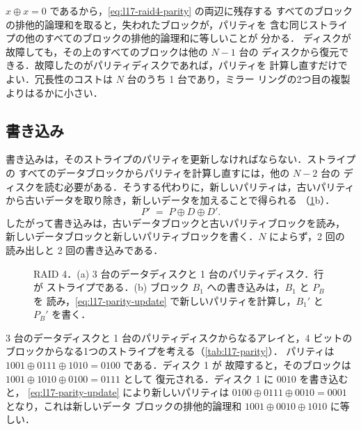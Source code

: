 \documentclass[../main.tex]{subfiles}
\begin{document}
$x \oplus x = 0$ であるから，\cref{eq:l17-raid4-parity} の両辺に残存する
すべてのブロックの排他的論理和を取ると，失われたブロックが，パリティを
含む同じストライプの他のすべてのブロックの排他的論理和に等しいことが
分かる．%
ディスクが故障しても，その上のすべてのブロックは他の $N-1$ 台の
ディスクから復元できる．故障したのがパリティディスクであれば，パリティを
計算し直すだけでよい．冗長性のコストは $N$ 台のうち 1 台であり，ミラー
リングの2つ目の複製よりはるかに小さい．

\subsection{書き込み}

書き込みは，そのストライプのパリティを更新しなければならない．ストライプの
すべてのデータブロックからパリティを計算し直すには，他の $N-2$ 台の
ディスクを読む必要がある．そうする代わりに，新しいパリティは，古いパリティ
から古いデータを取り除き，新しいデータを加えることで得られる
（\cref{fig:l17-raid4-write}b）．
\begin{equation}
  P' \;=\; P \oplus D \oplus D' .
  \label{eq:l17-parity-update}
\end{equation}
したがって書き込みは，古いデータブロックと古いパリティブロックを読み，
新しいデータブロックと新しいパリティブロックを書く．$N$ によらず，2 回の
読み出しと 2 回の書き込みである．

\begin{figure}[htbp]
  \centering
  
  \caption{RAID 4．(a) 3 台のデータディスクと 1 台のパリティディスク．行が
    ストライプである．(b) ブロック $B_1$ への書き込みは，$B_1$ と $P_B$ を
    読み，\cref{eq:l17-parity-update} で新しいパリティを計算し，$B_1'$ と
    $P_B'$ を書く．}
  \label{fig:l17-raid4-write}
\end{figure}

\begin{example}
  \label{ex:l17-parity}
  3 台のデータディスクと 1 台のパリティディスクからなるアレイと，4 ビットの
  ブロックからなる1つのストライプを考える（\cref{tab:l17-parity}）．
  パリティは $1001 \oplus 0111 \oplus 1010 = 0100$ である．ディスク 1 が
  故障すると，そのブロックは $1001 \oplus 1010 \oplus 0100 = 0111$ として
  復元される．ディスク 1 に $0010$ を書き込むと，
  \cref{eq:l17-parity-update} により新しいパリティは
  $0100 \oplus 0111 \oplus 0010 = 0001$ となり，これは新しいデータ
  ブロックの排他的論理和 $1001 \oplus 0010 \oplus 1010$ に等しい．
\end{example}
\end{document}
